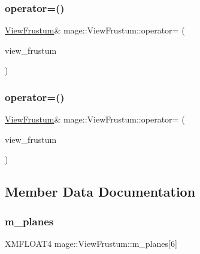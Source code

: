 \hypertarget{classmage_1_1_view_frustum_add514821f691117c0ab139c13f86ef70}{}\label{classmage_1_1_view_frustum_add514821f691117c0ab139c13f86ef70} 
\subsubsection{\texorpdfstring{operator=()}{operator=()}\hspace{0.1cm}{\footnotesize\ttfamily [1/2]}}
{\footnotesize\ttfamily \hyperlink{classmage_1_1_view_frustum}{View\+Frustum}\& mage\+::\+View\+Frustum\+::operator= (\begin{DoxyParamCaption}\item[{const \hyperlink{classmage_1_1_view_frustum}{View\+Frustum} \&}]{view\+\_\+frustum }\end{DoxyParamCaption})\hspace{0.3cm}{\ttfamily [default]}}

\hypertarget{classmage_1_1_view_frustum_a0167f34c3ba505155ed6064c6d98a99c}{}\label{classmage_1_1_view_frustum_a0167f34c3ba505155ed6064c6d98a99c} 
\subsubsection{\texorpdfstring{operator=()}{operator=()}\hspace{0.1cm}{\footnotesize\ttfamily [2/2]}}
{\footnotesize\ttfamily \hyperlink{classmage_1_1_view_frustum}{View\+Frustum}\& mage\+::\+View\+Frustum\+::operator= (\begin{DoxyParamCaption}\item[{\hyperlink{classmage_1_1_view_frustum}{View\+Frustum} \&\&}]{view\+\_\+frustum }\end{DoxyParamCaption})\hspace{0.3cm}{\ttfamily [default]}}



\subsection{Member Data Documentation}
\hypertarget{classmage_1_1_view_frustum_aa5d8b90bfc005bd19566983401ccd511}{}\label{classmage_1_1_view_frustum_aa5d8b90bfc005bd19566983401ccd511} 
\subsubsection{\texorpdfstring{m\+\_\+planes}{m\_planes}}
{\footnotesize\ttfamily X\+M\+F\+L\+O\+A\+T4 mage\+::\+View\+Frustum\+::m\+\_\+planes\mbox{[}6\mbox{]}\hspace{0.3cm}{\ttfamily [private]}}

